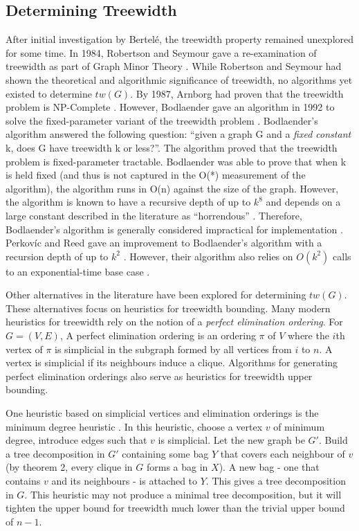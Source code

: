 \documentclass[12pt,conference]{IEEEtran}
\theoremstyle{plain}
\begin{document}
\subsection{Determining Treewidth}

After initial investigation by Bertel\'e, the treewidth property remained unexplored for some time. In 1984, Robertson and Seymour gave a re-examination of treewidth as part of Graph Minor Theory \cite{treewidth-rob-seymour}. While Robertson and Seymour had shown the theoretical and algorithmic significance of treewidth, no algorithms yet existed to determine $tw(G)$. By 1987, Arnborg had proven that the treewidth problem is NP-Complete \cite{arnborg-np-complete}. However, Bodlaender gave an algorithm in 1992 to solve the fixed-parameter variant of the treewidth problem \cite{bodlaender-1992}. Bodlaender's algorithm answered the following question: ``given a graph G and a \textit{fixed constant} k, does G have treewidth k or less?''. The algorithm proved that the treewidth problem is fixed-parameter tractable. Bodlaender was able to prove that when k is held fixed (and thus is not captured in the O(*) measurement of the algorithm), the algorithm runs in O(n) against the size of the graph. However, the algorithm is known to have a recursive depth of up to $k^{8}$ and depends on a large constant described in the literature as ``horrendous'' \cite{tw-alg-analysis}. Therefore, Bodlaender's algorithm is generally considered impractical for implementation \cite{fellows-on-bodlaender}. Perkov\'ic and Reed gave an improvement to Bodlaender's algorithm with a recursion depth of up to $k^{2}$ \cite{reed-tw-improvement}. However, their algorithm also relies on $O(k^{2})$ calls to an exponential-time base case \cite{tw-alg-analysis}.

Other alternatives in the literature have been explored for determining $tw(G)$. These alternatives focus on heuristics for treewidth bounding. Many modern heuristics for treewidth rely on the notion of a \textit{perfect elimination ordering}. For $G=(V,E)$, A perfect elimination ordering is an ordering $\pi$ of $V$ where the $i$th vertex of $\pi$ is simplicial in the subgraph formed by all vertices from $i$ to $n$. A vertex is simplicial if its neighbours induce a clique. Algorithms for generating perfect elimination orderings also serve as heuristics for treewidth upper bounding. 

One heuristic based on simplicial vertices and elimination orderings is the minimum degree heuristic \cite{min-degree-upper-bound}. In this heuristic, choose a vertex $v$ of minimum degree, introduce edges such that $v$ is simplicial. Let the new graph be $G'$. Build a tree decomposition in $G'$ containing some bag $Y$ that covers each neighbour of $v$ (by theorem 2, every clique in $G$ forms a bag in $X$). A new bag - one that contains $v$ and its neighbours - is attached to $Y$. This gives a tree decomposition in $G$. This heuristic may not produce a minimal tree decomposition, but it will tighten the upper bound for treewidth much lower than the trivial upper bound of $n-1$.
\end{document}
